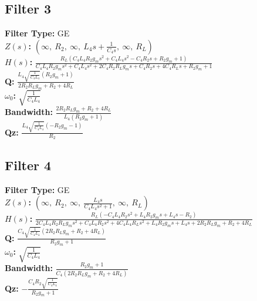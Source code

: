 \documentclass{article}
\begin{document}
\subsection*{Filter 3}
\textbf{Filter Type:} GE \\ 
\textbf{$Z(s)$:} $\left( \infty, \  R_{2}, \  \infty, \  L_{4} s + \frac{1}{C_{4} s}, \  \infty, \  R_{L}\right)$ \\ 
\textbf{$H(s)$:} $\frac{R_{L} \left(C_{4} L_{4} R_{2} g_{m} s^{2} + C_{4} L_{4} s^{2} - C_{4} R_{2} s + R_{2} g_{m} + 1\right)}{C_{4} L_{4} R_{2} g_{m} s^{2} + C_{4} L_{4} s^{2} + 2 C_{4} R_{2} R_{L} g_{m} s + C_{4} R_{2} s + 4 C_{4} R_{L} s + R_{2} g_{m} + 1}$ \\ 
\textbf{Q:} $\frac{L_{4} \sqrt{\frac{1}{C_{4} L_{4}}} \left(R_{2} g_{m} + 1\right)}{2 R_{2} R_{L} g_{m} + R_{2} + 4 R_{L}}$ \\ 
\textbf{$\omega_0$:} $\sqrt{\frac{1}{C_{4} L_{4}}}$ \\ 
\textbf{Bandwidth:} $\frac{2 R_{2} R_{L} g_{m} + R_{2} + 4 R_{L}}{L_{4} \left(R_{2} g_{m} + 1\right)}$ \\ 
\textbf{Qz:} $\frac{L_{4} \sqrt{\frac{1}{C_{4} L_{4}}} \left(- R_{2} g_{m} - 1\right)}{R_{2}}$ \\ 
\subsection*{Filter 4}
\textbf{Filter Type:} GE \\ 
\textbf{$Z(s)$:} $\left( \infty, \  R_{2}, \  \infty, \  \frac{L_{4} s}{C_{4} L_{4} s^{2} + 1}, \  \infty, \  R_{L}\right)$ \\ 
\textbf{$H(s)$:} $\frac{R_{L} \left(- C_{4} L_{4} R_{2} s^{2} + L_{4} R_{2} g_{m} s + L_{4} s - R_{2}\right)}{2 C_{4} L_{4} R_{2} R_{L} g_{m} s^{2} + C_{4} L_{4} R_{2} s^{2} + 4 C_{4} L_{4} R_{L} s^{2} + L_{4} R_{2} g_{m} s + L_{4} s + 2 R_{2} R_{L} g_{m} + R_{2} + 4 R_{L}}$ \\ 
\textbf{Q:} $\frac{C_{4} \sqrt{\frac{1}{C_{4} L_{4}}} \left(2 R_{2} R_{L} g_{m} + R_{2} + 4 R_{L}\right)}{R_{2} g_{m} + 1}$ \\ 
\textbf{$\omega_0$:} $\sqrt{\frac{1}{C_{4} L_{4}}}$ \\ 
\textbf{Bandwidth:} $\frac{R_{2} g_{m} + 1}{C_{4} \left(2 R_{2} R_{L} g_{m} + R_{2} + 4 R_{L}\right)}$ \\ 
\textbf{Qz:} $- \frac{C_{4} R_{2} \sqrt{\frac{1}{C_{4} L_{4}}}}{R_{2} g_{m} + 1}$ \\ 
\end{document}
